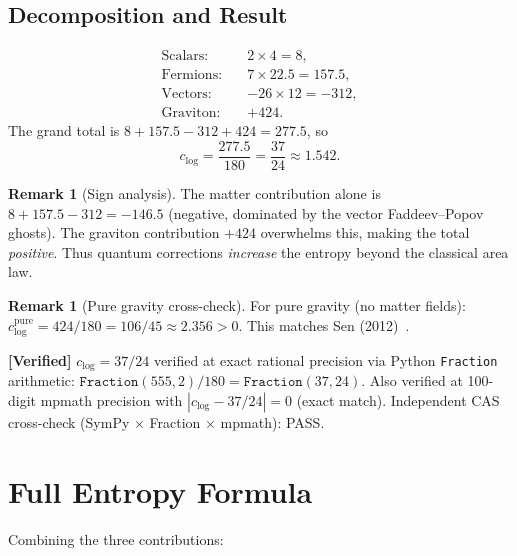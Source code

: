 \documentclass[11pt,a4paper]{article}
\theoremstyle{plain}
\theoremstyle{definition}
\newtheorem{remark}[theorem]{Remark}
\newcommand{\verified}[1]{%
  \par\smallskip\noindent
  \colorbox{green!10}{\parbox{\dimexpr\linewidth-2\fboxsep}{%
    \textcolor{green!50!black}{\textbf{[Verified]}} #1}}%
  \par\smallskip}
\begin{document}
\subsection{Decomposition and Result}

\begin{align}
  \text{Scalars:} \quad & 2 \times 4 = 8, \label{eq:scalar-contrib}\\
  \text{Fermions:} \quad & 7 \times 22.5 = 157.5, \label{eq:fermion-contrib}\\
  \text{Vectors:} \quad & -26 \times 12 = -312, \label{eq:vector-contrib}\\
  \text{Graviton:} \quad & +424. \label{eq:graviton-contrib}
\end{align}
The grand total is $8 + 157.5 - 312 + 424 = 277.5$, so
\begin{equation}\label{eq:c-log-result}
  \boxed{c_{\log} = \frac{277.5}{180} = \frac{37}{24} \approx 1.542.}
\end{equation}

\begin{remark}[Sign analysis]
The matter contribution alone is $8 + 157.5 - 312 = -146.5$
(negative, dominated by the vector Faddeev--Popov ghosts).
The graviton contribution $+424$ overwhelms this, making the
total \emph{positive}.  Thus quantum corrections \emph{increase}
the entropy beyond the classical area law.
\end{remark}

\begin{remark}[Pure gravity cross-check]
For pure gravity (no matter fields):
$c_{\log}^{\mathrm{pure}} = 424/180 = 106/45 \approx 2.356 > 0$.
This matches Sen (2012)~\cite{Sen12}.
\end{remark}

\verified{$c_{\log} = 37/24$ verified at exact rational precision
via Python \texttt{Fraction} arithmetic:
$\texttt{Fraction}(555, 2) / 180 = \texttt{Fraction}(37, 24)$.
Also verified at 100-digit mpmath precision with
$|c_{\log} - 37/24| = 0$ (exact match).
Independent CAS cross-check (SymPy $\times$ Fraction $\times$ mpmath): PASS.}

\section{Full Entropy Formula}\label{sec:full-entropy}

Combining the three contributions:
\end{document}
